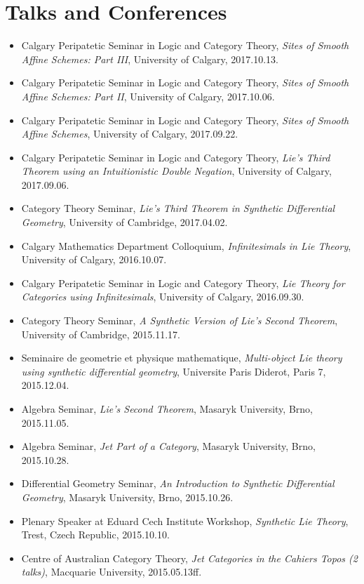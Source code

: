 \documentclass[10pt]{article}
\begin{document}
\section*{Talks and Conferences}
\begin{itemize}
    \item Calgary Peripatetic Seminar in Logic and Category Theory, \emph{Sites of Smooth Affine Schemes: Part III}, University of Calgary, 2017.10.13.
    \item Calgary Peripatetic Seminar in Logic and Category Theory, \emph{Sites of Smooth Affine Schemes: Part II}, University of Calgary, 2017.10.06.
    \item Calgary Peripatetic Seminar in Logic and Category Theory, \emph{Sites of Smooth Affine Schemes}, University of Calgary, 2017.09.22.
    \item  Calgary Peripatetic Seminar in Logic and Category Theory, \emph{Lie's Third Theorem using an Intuitionistic Double Negation}, University of Calgary, 2017.09.06.
    \item Category Theory Seminar, \emph{Lie's Third Theorem in Synthetic Differential Geometry},  University of Cambridge, 2017.04.02.
    \item Calgary Mathematics Department Colloquium, \emph{Infinitesimals in Lie Theory}, University of Calgary, 2016.10.07.
    \item Calgary Peripatetic Seminar in Logic and Category Theory, \emph{Lie Theory for Categories using Infinitesimals}, University of Calgary, 2016.09.30.
    \item Category Theory Seminar, \emph{A Synthetic Version of Lie's Second Theorem}, University of Cambridge, 2015.11.17.
    \item Seminaire de geometrie et physique mathematique, \emph{Multi-object Lie theory using synthetic differential geometry}, Universite Paris Diderot, Paris 7, 2015.12.04.
    \item Algebra Seminar, \emph{Lie's Second Theorem}, Masaryk University, Brno, 2015.11.05.
    \item Algebra Seminar, \emph{Jet Part of a Category}, Masaryk University, Brno, 2015.10.28.
    \item Differential Geometry Seminar, \emph{An Introduction to Synthetic Differential Geometry}, Masaryk University, Brno, 2015.10.26.
    \item Plenary Speaker at Eduard Cech Institute Workshop, \emph{Synthetic Lie Theory}, Trest, Czech Republic, 2015.10.10.
    \item Centre of Australian Category Theory, \emph{Jet Categories in the Cahiers Topos (2 talks)}, Macquarie University, 2015.05.13ff.

\end{itemize}
\end{document}
